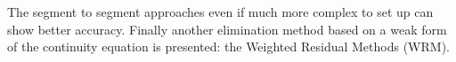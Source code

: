   The segment to segment approaches even if much more complex to set up can show better accuracy. Finally another elimination method based on a weak form of the continuity equation is presented: the Weighted Residual Methods (WRM).

